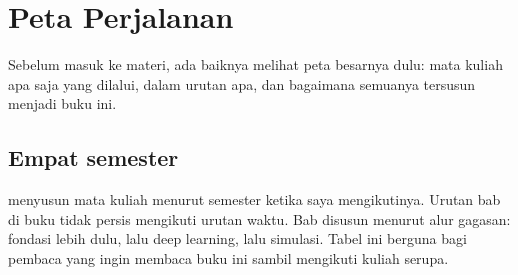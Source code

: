 \chapter{Peta Perjalanan}
\label{ch:peta}

Sebelum masuk ke materi, ada baiknya melihat peta besarnya dulu: mata kuliah apa saja yang
dilalui, dalam urutan apa, dan bagaimana semuanya tersusun menjadi buku ini.

\section{Empat semester}

 menyusun mata kuliah menurut semester ketika saya mengikutinya. Urutan
bab di buku tidak persis mengikuti urutan waktu. Bab disusun menurut alur gagasan: fondasi
lebih dulu, lalu deep learning, lalu simulasi. Tabel ini berguna bagi pembaca yang ingin
membaca buku ini sambil mengikuti kuliah serupa.

